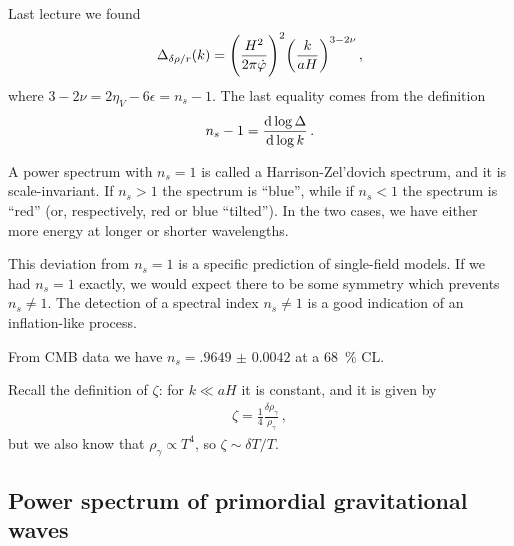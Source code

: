 \documentclass[main.tex]{subfiles}
\begin{document}

Last lecture we found 
%
\begin{align}\label{eq:density-perturbation-power-spectrum}
\Delta_{ \delta \rho / r } (k) 
= \qty(\frac{H^2}{2 \pi \dot{\varphi}})^2 \qty(\frac{k}{aH})^{3-2\nu }
\,,
\end{align}
%
where \(3 - 2 \nu = 2 \eta _V - 6 \epsilon = n_s -1\). 
The last equality comes from the definition 
%
\begin{align}
n_s - 1 = \dv{\log \Delta }{\log k}
\,.
\end{align}
%

A power spectrum with \(n_s = 1\) is called a Harrison-Zel'dovich spectrum, and it is scale-invariant.
If \(n_s > 1\) the spectrum is ``blue'', while if \(n_s < 1\) the spectrum is ``red'' (or, respectively, red or blue ``tilted''). 
In the two cases, we have either more energy at longer or shorter wavelengths.

This deviation from \(n_s = 1\) is a specific prediction of single-field models.
If we had \(n_s = 1\) exactly, we would expect there to be some symmetry which prevents \(n_s \neq 1\). 
The detection of a spectral index \(n_s \neq 1\) is a good indication of an inflation-like process. 

From CMB data \cite[eq.\ 21]{planckcollaborationPlanck2018Results2019} we have \(n_s = \num{.9649(42)}\) at a \SI{68}{\percent} CL.

Recall the definition of \(\zeta \): for \(k \ll aH\) it is constant, and it is given by 
%
\begin{align}
\zeta = \frac{1}{4} \frac{ \delta \rho _\gamma }{\rho _\gamma }
\,,
\end{align}
%
but we also know that \(\rho _\gamma \propto T^{4}\), so \(\zeta \sim \delta T / T\). 

\subsection{Power spectrum of primordial gravitational waves}
\end{document}

